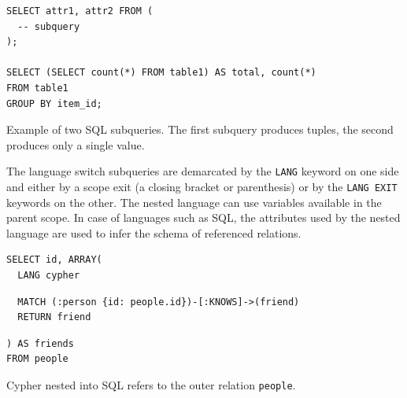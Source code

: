\begin{listing}[!ht]
\begin{verbatim}
SELECT attr1, attr2 FROM (
  -- subquery
);

SELECT (SELECT count(*) FROM table1) AS total, count(*)
FROM table1
GROUP BY item_id;
\end{verbatim}
\caption{Example of two SQL subqueries. The first subquery produces tuples, the second produces only a single value.}
\end{listing}

The language switch subqueries are demarcated by the \texttt{LANG} keyword on one side and either by a scope exit (a closing bracket or parenthesis) or by the \texttt{LANG EXIT} keywords on the other. The nested language can use variables available in the parent scope. In case of languages such as SQL, the attributes used by the nested language are used to infer the schema of referenced relations.

\begin{listing}[!ht]
\begin{verbatim}
SELECT id, ARRAY(
  LANG cypher
\end{verbatim}
\nestedMintedVspace
\begin{verbatim}
  MATCH (:person {id: people.id})-[:KNOWS]->(friend)
  RETURN friend
\end{verbatim}
\nestedMintedVspace
\begin{verbatim}
) AS friends
FROM people
\end{verbatim}
\caption{Cypher nested into SQL refers to the outer relation \texttt{people}.}
\end{listing}

